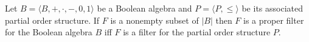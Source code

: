Let $B = \langle B, +, \cdot, -, 0, 1 \rangle$ be a Boolean algebra and $P = \langle P, \leq \rangle$ be its associated partial order structure. If $F$ is a nonempty subset of $|B|$ then $F$ is a proper filter for the Boolean algebra $B$ iff $F$ is a filter for the partial order structure $P$.
